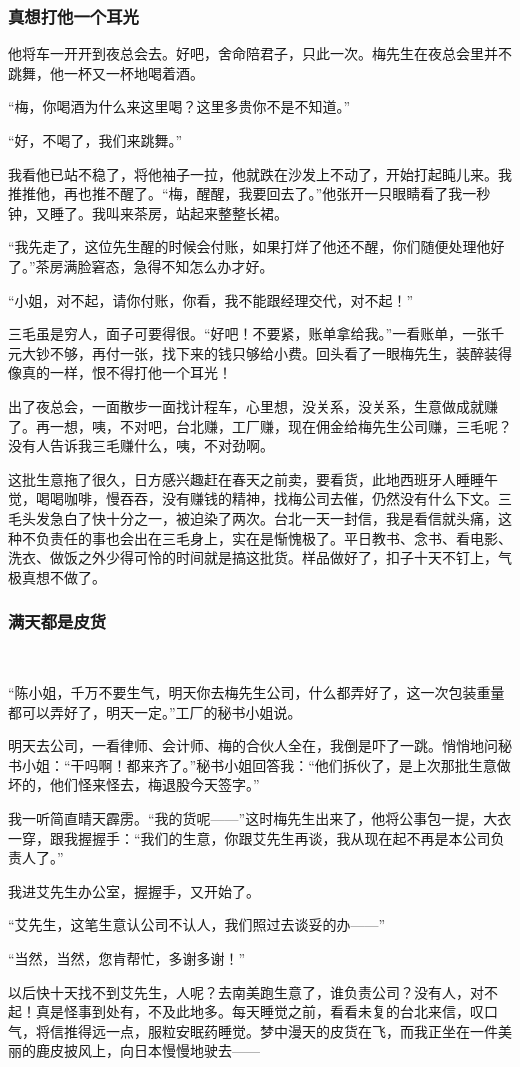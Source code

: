 \subsubsection*{真想打他一个耳光}
\par 他将车一开开到夜总会去。好吧，舍命陪君子，只此一次。梅先生在夜总会里并不跳舞，他一杯又一杯地喝着酒。
\par “梅，你喝酒为什么来这里喝？这里多贵你不是不知道。”
\par “好，不喝了，我们来跳舞。”
\par 我看他已站不稳了，将他袖子一拉，他就跌在沙发上不动了，开始打起盹儿来。我推推他，再也推不醒了。“梅，醒醒，我要回去了。”他张开一只眼睛看了我一秒钟，又睡了。我叫来茶房，站起来整整长裙。
\par “我先走了，这位先生醒的时候会付账，如果打烊了他还不醒，你们随便处理他好了。”茶房满脸窘态，急得不知怎么办才好。
\par “小姐，对不起，请你付账，你看，我不能跟经理交代，对不起！”
\par 三毛虽是穷人，面子可要得很。“好吧！不要紧，账单拿给我。”一看账单，一张千元大钞不够，再付一张，找下来的钱只够给小费。回头看了一眼梅先生，装醉装得像真的一样，恨不得打他一个耳光！
\par 出了夜总会，一面散步一面找计程车，心里想，没关系，没关系，生意做成就赚了。再一想，咦，不对吧，台北赚，工厂赚，现在佣金给梅先生公司赚，三毛呢？没有人告诉我三毛赚什么，咦，不对劲啊。
\par 这批生意拖了很久，日方感兴趣赶在春天之前卖，要看货，此地西班牙人睡睡午觉，喝喝咖啡，慢吞吞，没有赚钱的精神，找梅公司去催，仍然没有什么下文。三毛头发急白了快十分之一，被迫染了两次。台北一天一封信，我是看信就头痛，这种不负责任的事也会出在三毛身上，实在是惭愧极了。平日教书、念书、看电影、洗衣、做饭之外少得可怜的时间就是搞这批货。样品做好了，扣子十天不钉上，气极真想不做了。
\subsubsection*{满天都是皮货} 
\par “陈小姐，千万不要生气，明天你去梅先生公司，什么都弄好了，这一次包装重量都可以弄好了，明天一定。”工厂的秘书小姐说。
\par 明天去公司，一看律师、会计师、梅的合伙人全在，我倒是吓了一跳。悄悄地问秘书小姐：“干吗啊！都来齐了。”秘书小姐回答我：“他们拆伙了，是上次那批生意做坏的，他们怪来怪去，梅退股今天签字。”
\par 我一听简直晴天霹雳。“我的货呢——”这时梅先生出来了，他将公事包一提，大衣一穿，跟我握握手：“我们的生意，你跟艾先生再谈，我从现在起不再是本公司负责人了。”
\par 我进艾先生办公室，握握手，又开始了。
\par “艾先生，这笔生意认公司不认人，我们照过去谈妥的办——”
\par “当然，当然，您肯帮忙，多谢多谢！”
\par 以后快十天找不到艾先生，人呢？去南美跑生意了，谁负责公司？没有人，对不起！真是怪事到处有，不及此地多。每天睡觉之前，看看未复的台北来信，叹口气，将信推得远一点，服粒安眠药睡觉。梦中漫天的皮货在飞，而我正坐在一件美丽的鹿皮披风上，向日本慢慢地驶去——
